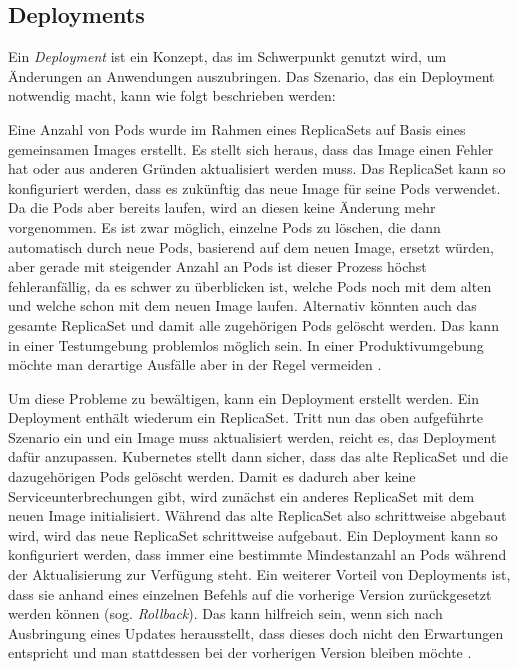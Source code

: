 \documentclass[11pt,a4paper]{article}
\begin{document}
\subsection{Deployments}
\label{sec:Deployments}
Ein \emph{Deployment} ist ein Konzept, das im Schwerpunkt genutzt wird, um Änderungen an Anwendungen auszubringen.
Das Szenario, das ein Deployment notwendig macht, kann wie folgt beschrieben werden:

Eine Anzahl von Pods wurde im Rahmen eines ReplicaSets auf Basis eines gemeinsamen Images erstellt.
Es stellt sich heraus, dass das Image einen Fehler hat oder aus anderen Gründen aktualisiert werden muss.
Das ReplicaSet kann so konfiguriert werden, dass es zukünftig das neue Image für seine Pods verwendet.
Da die Pods aber bereits laufen, wird an diesen keine Änderung mehr vorgenommen. Es ist zwar möglich,
einzelne Pods zu löschen, die dann automatisch durch neue Pods, basierend auf dem neuen Image, ersetzt würden, aber
gerade mit steigender Anzahl an Pods ist dieser Prozess höchst
fehleranfällig, da es schwer zu überblicken ist, welche Pods noch mit dem alten und welche schon mit dem
neuen Image laufen. Alternativ könnten auch das gesamte ReplicaSet und damit alle zugehörigen Pods gelöscht werden.
Das kann in einer Testumgebung problemlos möglich sein. In einer Produktivumgebung möchte man derartige
Ausfälle aber in der Regel vermeiden \cite{Schmeling_Dargatz_2022}. %

Um diese Probleme zu bewältigen, kann ein Deployment erstellt werden.
Ein Deployment enthält wiederum ein ReplicaSet. Tritt nun das oben aufgeführte Szenario ein und ein Image
muss aktualisiert werden, reicht es, das Deployment dafür anzupassen.
Kubernetes stellt dann sicher, dass das alte ReplicaSet und die dazugehörigen Pods gelöscht werden.
Damit es dadurch aber keine Serviceunterbrechungen gibt, wird zunächst ein anderes ReplicaSet mit dem neuen
Image initialisiert. Während das alte ReplicaSet also schrittweise abgebaut wird, wird das neue ReplicaSet
schrittweise aufgebaut. Ein Deployment kann so konfiguriert werden, dass immer eine bestimmte Mindestanzahl an
Pods während der Aktualisierung zur Verfügung steht.
Ein weiterer Vorteil von Deployments ist, dass sie anhand eines einzelnen Befehls auf die vorherige Version
zurückgesetzt werden können (sog. \emph{Rollback}). Das kann hilfreich sein, wenn sich nach Ausbringung eines
Updates herausstellt, dass dieses doch nicht den Erwartungen entspricht und man stattdessen bei der vorherigen
Version bleiben möchte \cite{Schmeling_Dargatz_2022}.
\end{document}
